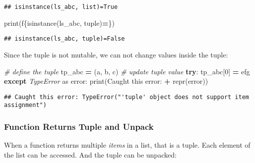 \documentclass[
]{book}
\newenvironment{Shaded}{\begin{snugshade}}{\end{snugshade}}
\newcommand{\BuiltInTok}[1]{#1}
\newcommand{\CommentTok}[1]{\textcolor[rgb]{0.56,0.35,0.01}{\textit{#1}}}
\newcommand{\ControlFlowTok}[1]{\textcolor[rgb]{0.13,0.29,0.53}{\textbf{#1}}}
\newcommand{\DecValTok}[1]{\textcolor[rgb]{0.00,0.00,0.81}{#1}}
\newcommand{\ImportTok}[1]{#1}
\newcommand{\NormalTok}[1]{#1}
\newcommand{\OperatorTok}[1]{\textcolor[rgb]{0.81,0.36,0.00}{\textbf{#1}}}
\newcommand{\PreprocessorTok}[1]{\textcolor[rgb]{0.56,0.35,0.01}{\textit{#1}}}
\newcommand{\SpecialCharTok}[1]{\textcolor[rgb]{0.00,0.00,0.00}{#1}}
\newcommand{\SpecialStringTok}[1]{\textcolor[rgb]{0.31,0.60,0.02}{#1}}
\newcommand{\StringTok}[1]{\textcolor[rgb]{0.31,0.60,0.02}{#1}}
\begin{document}
\begin{verbatim}
## isinstance(ls_abc, list)=True
\end{verbatim}

\begin{Shaded}
\begin{Highlighting}[]
\BuiltInTok{print}\NormalTok{(}\SpecialStringTok{f\textquotesingle{}}\SpecialCharTok{\{}\BuiltInTok{isinstance}\NormalTok{(ls\_abc, }\BuiltInTok{tuple}\NormalTok{)}\OperatorTok{=}\SpecialCharTok{\}}\SpecialStringTok{\textquotesingle{}}\NormalTok{)}
\end{Highlighting}
\end{Shaded}

\begin{verbatim}
## isinstance(ls_abc, tuple)=False
\end{verbatim}

Since the tuple is not mutable, we can not change values inside the tuple:

\begin{Shaded}
\begin{Highlighting}[]
\CommentTok{\# define the tuple}
\NormalTok{tp\_abc }\OperatorTok{=}\NormalTok{ (}\StringTok{\textquotesingle{}a\textquotesingle{}}\NormalTok{, }\StringTok{\textquotesingle{}b\textquotesingle{}}\NormalTok{, }\StringTok{\textquotesingle{}c\textquotesingle{}}\NormalTok{)}
\CommentTok{\# update tuple value}
\ControlFlowTok{try}\NormalTok{:}
\NormalTok{    tp\_abc[}\DecValTok{0}\NormalTok{] }\OperatorTok{=} \StringTok{\textquotesingle{}efg\textquotesingle{}}
\ControlFlowTok{except} \PreprocessorTok{TypeError} \ImportTok{as}\NormalTok{ error:}
    \BuiltInTok{print}\NormalTok{(}\StringTok{\textquotesingle{}Caught this error: \textquotesingle{}} \OperatorTok{+} \BuiltInTok{repr}\NormalTok{(error))}
\end{Highlighting}
\end{Shaded}

\begin{verbatim}
## Caught this error: TypeError("'tuple' object does not support item assignment")
\end{verbatim}

\hypertarget{function-returns-tuple-and-unpack}{%
\subsubsection{Function Returns Tuple and Unpack}\label{function-returns-tuple-and-unpack}}

When a function returns multiple \emph{items} in a list, that is a tuple. Each element of the list can be accessed. And the tuple can be unpacked:
\end{document}
